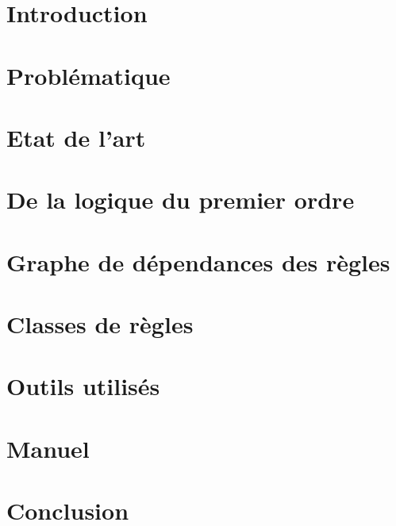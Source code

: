 \documentclass[a4paper]{report}
\begin{document}
\large
\setlength{\parskip}{5mm plus2mm minus2mm}
\lstset{language=Java, showstringspaces=false, numbers=left, numberstyle=\tiny, tabsize=4}




\chapter{Introduction}\label{introduction}


\chapter{Probl\'ematique}\label{problematique}


\chapter{Etat de l'art}\label{etatart}


\chapter{De la logique du premier ordre}\label{definitions}


\chapter{Graphe de d\'ependances des r\`egles}\label{grd}


\chapter{Classes de r\`egles}\label{classes_regles}


\chapter{Outils utilis\'es}\label{outils_utilises}


\chapter{Manuel}\label{manuel}


\chapter{Conclusion}\label{conclusion}

\end{document}
